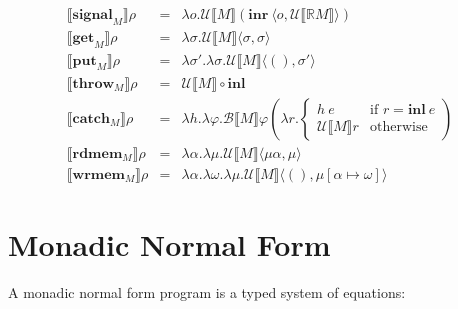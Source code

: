 \documentclass{article}[11pt]
\begin{document}
\begin{eqnarray*}
\llbracket{}\mathbf{signal}_M\rrbracket\rho &=& \lambda o . \mathcal{U}\llbracket{}M\rrbracket(\mathbf{inr}~ \langle o,\mathcal{U}\llbracket{}\mathbb{R}M\rrbracket\rangle)\\
\llbracket{}\mathbf{get}_M\rrbracket\rho &=& \lambda \sigma . \mathcal{U}\llbracket{}M\rrbracket\langle\sigma,\sigma\rangle\\
\llbracket{}\mathbf{put}_M\rrbracket\rho &=& \lambda \sigma' . \lambda \sigma . \mathcal{U}\llbracket{}M\rrbracket\langle(),\sigma'\rangle\\
\llbracket{}\mathbf{throw}_M\rrbracket\rho &=& \mathcal{U}\llbracket{}M\rrbracket \circ \mathbf{inl}\\
\llbracket{}\mathbf{catch}_M\rrbracket\rho &=& \lambda h . \lambda \varphi . \mathcal{B}\llbracket{}M\rrbracket\varphi\left(\lambda r . \begin{cases}
                                                                                                                                               h~ e&\text{if }r = \mathbf{inl}~ e\\
                                                                                                                                               \mathcal{U}\llbracket{}M\rrbracket r&\text{otherwise}
                                                                                                                                              \end{cases}\right)\\
\llbracket{}\mathbf{rdmem}_M\rrbracket\rho &=& \lambda \alpha . \lambda \mu . \mathcal{U}\llbracket{}M\rrbracket \langle\mu\alpha,\mu\rangle\\
\llbracket{}\mathbf{wrmem}_M\rrbracket\rho &=& \lambda \alpha . \lambda \omega . \lambda \mu . \mathcal{U}\llbracket{}M\rrbracket \langle(),\mu[\alpha \mapsto \omega]\rangle
\end{eqnarray*}

\section{Monadic Normal Form}
A monadic normal form program is a typed system of equations:
\end{document}
